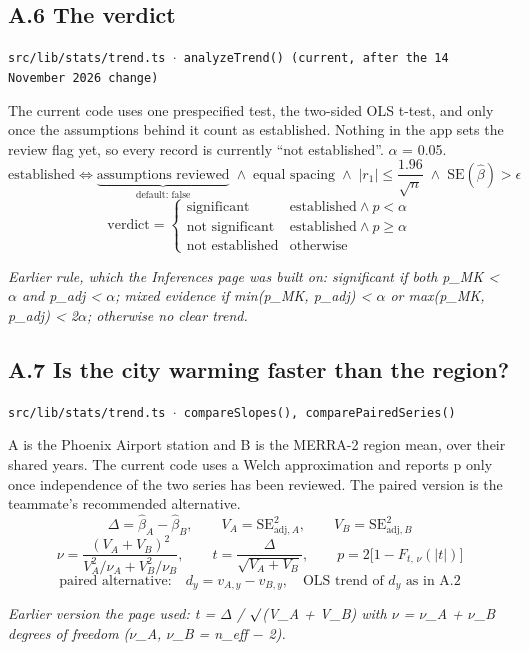 \documentclass[10pt,a4paper]{article}
\begin{document}
\subsection*{A.6 The verdict}
{\footnotesize\texttt{src/lib/stats/trend.ts $\cdot$ analyzeTrend() (current, after the 14 November 2026 change)}}

The current code uses one prespecified test, the two-sided OLS t-test, and only once the assumptions behind it count as established. Nothing in the app sets the review flag yet, so every record is currently ``not established''. $\alpha$ = 0.05.
\[
\text{established} \iff \underbrace{\text{assumptions reviewed}}_{\text{default: false}} \;\wedge\; \text{equal spacing} \;\wedge\; |r_1| \le \frac{1.96}{\sqrt{n}} \;\wedge\; \mathrm{SE}(\hat\beta) > \epsilon
\]
\[
\text{verdict} = \begin{cases} \text{significant} & \text{established} \wedge p < \alpha \\ \text{not significant} & \text{established} \wedge p \ge \alpha \\ \text{not established} & \text{otherwise} \end{cases}
\]

\emph{Earlier rule, which the Inferences page was built on: significant if both p\_MK < $\alpha$ and p\_adj < $\alpha$; mixed evidence if min(p\_MK, p\_adj) < $\alpha$ or max(p\_MK, p\_adj) < 2$\alpha$; otherwise no clear trend.}

\subsection*{A.7 Is the city warming faster than the region?}
{\footnotesize\texttt{src/lib/stats/trend.ts $\cdot$ compareSlopes(), comparePairedSeries()}}

A is the Phoenix Airport station and B is the MERRA-2 region mean, over their shared years. The current code uses a Welch approximation and reports p only once independence of the two series has been reviewed. The paired version is the teammate's recommended alternative.
\[
\Delta = \hat\beta_A - \hat\beta_B, \qquad V_A = \mathrm{SE}_{\text{adj},A}^2, \qquad V_B = \mathrm{SE}_{\text{adj},B}^2
\]
\[
\nu = \frac{(V_A + V_B)^2}{V_A^2/\nu_A + V_B^2/\nu_B}, \qquad t = \frac{\Delta}{\sqrt{V_A + V_B}}, \qquad p = 2\bigl[1 - F_{t,\,\nu}(|t|)\bigr]
\]
\[
\text{paired alternative:}\quad d_y = v_{A,y} - v_{B,y}, \quad \text{OLS trend of } d_y \text{ as in A.2}
\]

\emph{Earlier version the page used: t = $\Delta$ / $\surd$(V\_A + V\_B) with $\nu$ = $\nu$\_A + $\nu$\_B degrees of freedom ($\nu$\_A, $\nu$\_B = n\_eff $-$ 2).}
\end{document}
